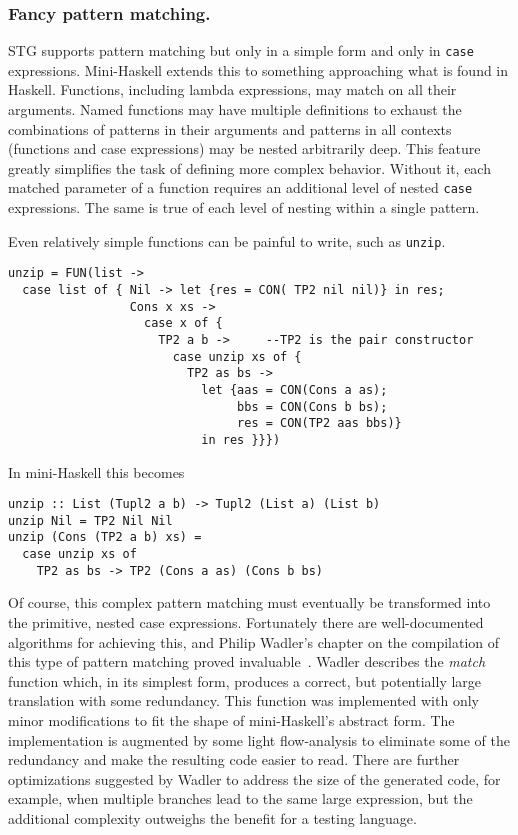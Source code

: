 \documentclass{llncs}
\begin{document}
\subsubsection{Fancy pattern matching.}

STG supports pattern matching but only in a simple form and only in
\texttt{case} expressions.  Mini-Haskell extends this to something approaching
what is found in Haskell.  Functions, including lambda expressions, may match on
all their arguments. Named functions may have multiple definitions to exhaust
the combinations of patterns in their arguments and patterns in all contexts
(functions and case expressions) may be nested arbitrarily deep.  This feature
greatly simplifies the task of defining more complex behavior.  Without it,
each matched parameter of a function requires an additional level of nested
\texttt{case} expressions. The same is true of each level of nesting within a
single pattern.

Even relatively simple functions can be painful to write, such as \texttt{unzip}.
{\footnotesize
\begin{verbatim}
unzip = FUN(list ->
  case list of { Nil -> let {res = CON( TP2 nil nil)} in res;
                 Cons x xs ->
                   case x of {
                     TP2 a b ->     --TP2 is the pair constructor
                       case unzip xs of {
                         TP2 as bs ->
                           let {aas = CON(Cons a as);
                                bbs = CON(Cons b bs);
                                res = CON(TP2 aas bbs)}
                           in res }}})
\end{verbatim}}
\noindent In mini-Haskell this becomes
{\footnotesize
\begin{verbatim}
unzip :: List (Tupl2 a b) -> Tupl2 (List a) (List b)
unzip Nil = TP2 Nil Nil
unzip (Cons (TP2 a b) xs) =
  case unzip xs of
    TP2 as bs -> TP2 (Cons a as) (Cons b bs)
\end{verbatim}}

Of course, this complex pattern matching must eventually be transformed into
the primitive, nested case expressions. Fortunately there are well-documented
algorithms for achieving this, and Philip Wadler's chapter
on the compilation of this type of pattern matching proved
invaluable~\cite{Jones:1987}.  Wadler describes the \emph{match} function
which, in its simplest form, produces a correct, but potentially large
translation with some redundancy.  This function was implemented with only
minor modifications to fit the shape of mini-Haskell's abstract form.  The
implementation is augmented by some light flow-analysis to eliminate some of
the redundancy and make the resulting code easier to read.  There are further
optimizations suggested by Wadler to address the size of the generated code,
for example, when multiple branches lead to the same large expression, but the
additional complexity outweighs the benefit for a testing language.
\end{document}
